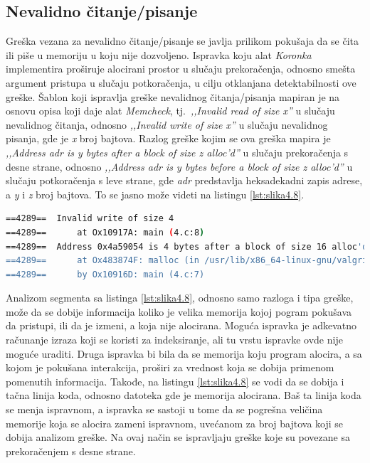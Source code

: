 \documentclass[12pt,oneside]{memoir}
\theoremstyle{plain}
\theoremstyle{definition}
\begin{document}
\subsection{Nevalidno čitanje/pisanje}
Greška vezana za nevalidno čitanje/pisanje se javlja prilikom pokušaja da se čita ili piše u memoriju u koju nije dozvoljeno. Ispravka koju alat \textit{Koronka} implementira proširuje alocirani prostor u slučaju prekoračenja, odnosno smešta argument pristupa u slučaju potkoračenja, u cilju otklanjana detektabilnosti ove greške. Šablon koji ispravlja greške nevalidnog čitanja/pisanja mapiran je na osnovu opisa koji daje alat \textit{Memcheck}, tj.~\textit{,,Invalid read of size x''} u slučaju nevalidnog čitanja, odnosno \textit{,,Invalid write of size x''} u slučaju nevalidnog pisanja, gde je \textit{x} broj bajtova. Razlog greške kojim se ova greška mapira je \textit{,,Address adr is y bytes after a block of size z alloc'd''} u slučaju prekoračenja s desne strane, odnosno \textit{,,Address adr is y bytes before a block of size z alloc'd''} u slučaju potkoračenja s leve strane, gde \textit{adr} predstavlja heksadekadni zapis adrese, a \textit{y} i \textit{z} broj bajtova. To se jasno može videti na listingu \ref{lst:slika4.8}.


\begin{lstlisting}[style=terminal,caption={Ispis greške nevalidnog čitanja}, label={lst:slika4.8},language={bash}]   
==4289==  Invalid write of size 4
==4289==      at Ox10917A: main (4.c:8)
==4289==  Address 0x4a59054 is 4 bytes after a block of size 16 alloc'd
==4289==      at Ox483874F: malloc (in /usr/lib/x86_64-linux-gnu/valgrind/vgpreload_memcheck-amd64-linux.so) 
==4289==      by Ox10916D: main (4.c:7)
\end{lstlisting}

Analizom segmenta sa listinga \ref{lst:slika4.8}, odnosno samo razloga i tipa greške, može da se dobije informacija koliko je velika memorija kojoj pogram pokušava da pristupi, ili da je izmeni, a koja nije alocirana. Moguća ispravka je adkevatno računanje izraza koji se koristi za indeksiranje, ali tu vrstu ispravke ovde nije moguće uraditi. Druga ispravka bi bila da se memorija koju program alocira, a sa kojom je pokušana interakcija, proširi za vrednost koja se dobija primenom pomenutih informacija. Takođe, na listingu \ref{lst:slika4.8} se vodi da se dobija i tačna linija koda, odnosno datoteka gde je memorija alocirana. Baš ta linija koda se menja ispravnom, a ispravka se sastoji u tome da se pogrešna veličina memorije koja se alocira zameni ispravnom, uvećanom za broj bajtova koji se dobija analizom greške. Na ovaj način se ispravljaju greške koje su povezane sa prekoračenjem s desne strane. 
\end{document}
